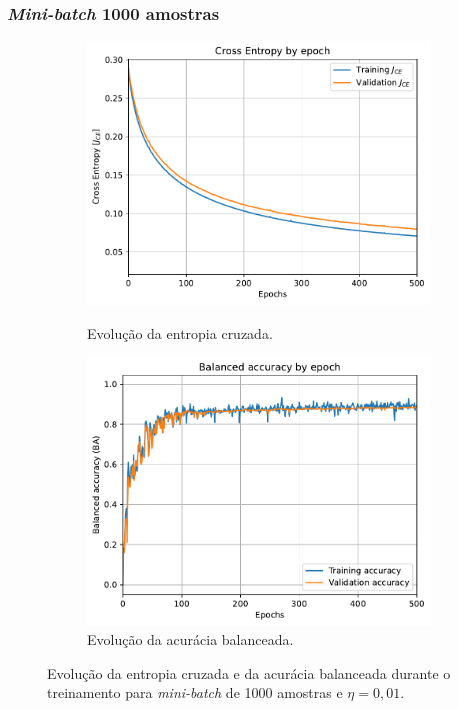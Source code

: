 \subsubsection*{\textit{Mini-batch} 1000 amostras}

\begin{figure}[H]
	\begin{subfigure}[H]{0.49\textwidth}
		\centering
		\includegraphics[width = 0.98\linewidth]{../../plot/LR_1/CE_500_epochs_batch_size1000}
		\label{fig:CE_500_epochs_batch_size1000}
		\caption{Evolução da entropia cruzada.}
	\end{subfigure}
	\begin{subfigure}[H]{0.49\textwidth}
		\centering
		\includegraphics[width = 0.99\linewidth]{../../plot/LR_1/BA_500_epochs_batch_size1000}
		\caption{Evolução da acurácia balanceada.}
		\label{fig:BA_500_epochs_batch_size1000}
	\end{subfigure}
	\caption{Evolução da entropia cruzada e da acurácia balanceada durante o treinamento para \textit{mini-batch} de 1000 amostras e $\eta = 0,01$.}
\end{figure}

